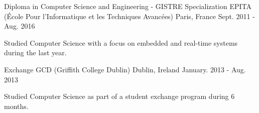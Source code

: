 

\begin{cventries}

  \cventry
    {Diploma in Computer Science and Engineering - GISTRE Specialization} %
    {EPITA (École Pour l'Informatique et les Techniques Avancées)} %
    {Paris, France} %
    {Sept. 2011 - Aug. 2016} %
    {
      \begin{cvitems} %
        \item {Studied Computer Science with a focus on embedded and real-time systems during the last year.}
      \end{cvitems}
    }
  \cventry
    {Exchange} %
    {GCD (Griffith College Dublin)} %
    {Dublin, Ireland} %
    {January. 2013 - Aug. 2013} %
    {
      \begin{cvitems} %
        \item {Studied Computer Science as part of a student exchange program during 6 months.}
      \end{cvitems}
    }

\end{cventries}
